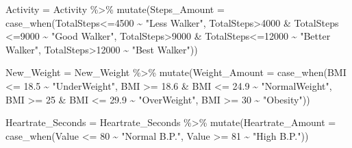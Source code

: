 \documentclass[
]{article}
\newenvironment{Shaded}{\begin{snugshade}}{\end{snugshade}}
\newcommand{\AttributeTok}[1]{\textcolor[rgb]{0.77,0.63,0.00}{#1}}
\newcommand{\DecValTok}[1]{\textcolor[rgb]{0.00,0.00,0.81}{#1}}
\newcommand{\FloatTok}[1]{\textcolor[rgb]{0.00,0.00,0.81}{#1}}
\newcommand{\FunctionTok}[1]{\textcolor[rgb]{0.00,0.00,0.00}{#1}}
\newcommand{\NormalTok}[1]{#1}
\newcommand{\OtherTok}[1]{\textcolor[rgb]{0.56,0.35,0.01}{#1}}
\newcommand{\SpecialCharTok}[1]{\textcolor[rgb]{0.00,0.00,0.00}{#1}}
\newcommand{\StringTok}[1]{\textcolor[rgb]{0.31,0.60,0.02}{#1}}
\begin{document}
\begin{Shaded}
\begin{Highlighting}[]
\NormalTok{  Activity }\OtherTok{=}\NormalTok{ Activity }\SpecialCharTok{\%\textgreater{}\%} 
  \FunctionTok{mutate}\NormalTok{(}\AttributeTok{Steps\_Amount =} \FunctionTok{case\_when}\NormalTok{(TotalSteps}\SpecialCharTok{\textless{}=}\DecValTok{4500} \SpecialCharTok{\textasciitilde{}} \StringTok{"Less Walker"}\NormalTok{,}
\NormalTok{    TotalSteps}\SpecialCharTok{\textgreater{}}\DecValTok{4000} \SpecialCharTok{\&}\NormalTok{ TotalSteps }\SpecialCharTok{\textless{}=}\DecValTok{9000} \SpecialCharTok{\textasciitilde{}} \StringTok{"Good Walker"}\NormalTok{, TotalSteps}\SpecialCharTok{\textgreater{}}\DecValTok{9000} \SpecialCharTok{\&}\NormalTok{ TotalSteps}\SpecialCharTok{\textless{}=}\DecValTok{12000} \SpecialCharTok{\textasciitilde{}} \StringTok{"Better Walker"}\NormalTok{,}
\NormalTok{    TotalSteps}\SpecialCharTok{\textgreater{}}\DecValTok{12000} \SpecialCharTok{\textasciitilde{}} \StringTok{"Best Walker"}\NormalTok{))}
\end{Highlighting}
\end{Shaded}

\begin{Shaded}
\begin{Highlighting}[]
\NormalTok{New\_Weight }\OtherTok{=}\NormalTok{ New\_Weight }\SpecialCharTok{\%\textgreater{}\%} 
\FunctionTok{mutate}\NormalTok{(}\AttributeTok{Weight\_Amount =} \FunctionTok{case\_when}\NormalTok{(BMI }\SpecialCharTok{\textless{}=} \FloatTok{18.5} \SpecialCharTok{\textasciitilde{}} \StringTok{"UnderWeight"}\NormalTok{, BMI }\SpecialCharTok{\textgreater{}=} \FloatTok{18.6} \SpecialCharTok{\&}\NormalTok{ BMI }\SpecialCharTok{\textless{}=} \FloatTok{24.9} \SpecialCharTok{\textasciitilde{}} \StringTok{"NormalWeight"}\NormalTok{, BMI }\SpecialCharTok{\textgreater{}=} \DecValTok{25} \SpecialCharTok{\&}\NormalTok{ BMI }\SpecialCharTok{\textless{}=} \FloatTok{29.9} \SpecialCharTok{\textasciitilde{}} \StringTok{"OverWeight"}\NormalTok{, BMI }\SpecialCharTok{\textgreater{}=} \DecValTok{30} \SpecialCharTok{\textasciitilde{}} \StringTok{"Obesity"}\NormalTok{))}
\end{Highlighting}
\end{Shaded}

\begin{Shaded}
\begin{Highlighting}[]
\NormalTok{Heartrate\_Seconds }\OtherTok{=}\NormalTok{ Heartrate\_Seconds }\SpecialCharTok{\%\textgreater{}\%}
\FunctionTok{mutate}\NormalTok{(}\AttributeTok{Heartrate\_Amount =} \FunctionTok{case\_when}\NormalTok{(Value }\SpecialCharTok{\textless{}=} \DecValTok{80} \SpecialCharTok{\textasciitilde{}} \StringTok{"Normal B.P."}\NormalTok{, }
\NormalTok{Value }\SpecialCharTok{\textgreater{}=} \DecValTok{81} \SpecialCharTok{\textasciitilde{}} \StringTok{"High B.P."}\NormalTok{))}
\end{Highlighting}
\end{Shaded}
\end{document}
